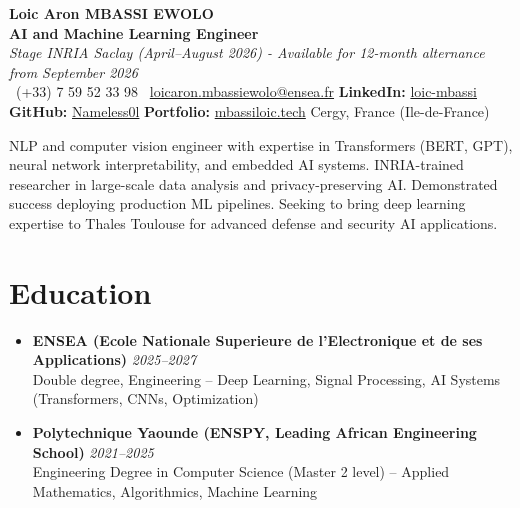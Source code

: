 \documentclass[a4paper,11pt]{article}
\begin{document}
\begin{center}
    {\Large \textbf{Loic Aron MBASSI EWOLO}} \\ \vspace{4pt}
    \textbf{\large AI and Machine Learning Engineer} \\
    \textit{\small Stage INRIA Saclay (April--August 2026) - Available for 12-month alternance from September 2026} \\ \vspace{4pt}
    \small
    \Mobilefone\ (+33) 7 59 52 33 98 \quad
    \Letter\ \href{mailto:loicaron.mbassiewolo@ensea.fr}{loicaron.mbassiewolo@ensea.fr} \quad
    \textbf{LinkedIn:} \href{https://www.linkedin.com/in/loic-mbassi/}{loic-mbassi} \\ \vspace{2pt}
    \textbf{GitHub:} \href{https://github.com/Nameless0l}{Nameless0l} \quad
    \textbf{Portfolio:} \href{https://mbassiloic.tech}{mbassiloic.tech} \quad
    Cergy, France (Ile-de-France)
\end{center}

\vspace{-6pt}

\noindent\small{NLP and computer vision engineer with expertise in Transformers (BERT, GPT), neural network interpretability, and embedded AI systems. INRIA-trained researcher in large-scale data analysis and privacy-preserving AI. Demonstrated success deploying production ML pipelines. Seeking to bring deep learning expertise to Thales Toulouse for advanced defense and security AI applications.}

\vspace{6pt}

\section{Education}
\begin{itemize}[leftmargin=*, label=\tiny$\bullet$, nosep]
    \item \textbf{ENSEA (Ecole Nationale Superieure de l'Electronique et de ses Applications)} \hfill \textit{2025--2027} \\
    \small{Double degree, Engineering -- Deep Learning, Signal Processing, AI Systems (Transformers, CNNs, Optimization)}
    \item \textbf{Polytechnique Yaounde (ENSPY, Leading African Engineering School)} \hfill \textit{2021--2025} \\
    \small{Engineering Degree in Computer Science (Master 2 level) -- Applied Mathematics, Algorithmics, Machine Learning}
\end{itemize}
\end{document}
